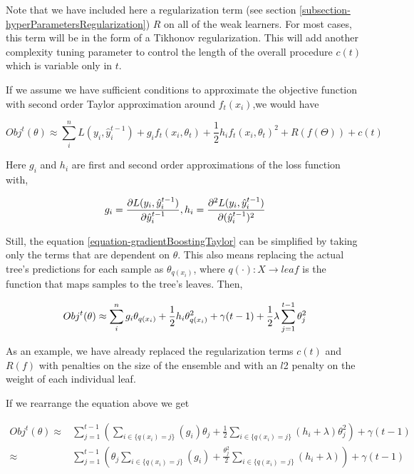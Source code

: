 Note that we have included here a regularization term (see section \cref{subsection-hyperParametersRegularization}) $R$ on all of the weak learners. For most cases, this term will be in the form of a Tikhonov regularization. This will add another complexity tuning parameter to control the length of the overall procedure $c(t)$ which is variable only in $t$.

If we assume we have sufficient conditions to approximate the objective function with second order Taylor approximation around $f_t(x_i)$,we would have

\begin{equation}\label{equation-gradientBoostingTaylor}
Obj^t(\theta) \approx \sum_i^n {L(y_i, \hat{y}^{t-1}_i) + g_i f_t(x_i,\theta_t) + \frac{1}{2} h_i f_t(x_i,\theta_t)^2 } + R(f(\Theta)) + c(t)
\end{equation}

Here $g_i$ and $h_i$ are first and second order approximations of the loss function with,

\begin{equation}
g_i = \frac{\partial L(y_i, \hat{y}^{t-1}_i)}{\partial \hat{y}^{t-1}_i}, \ \\
h_i = \frac{\partial^2 L(y_i, \hat{y}^{t-1}_i)}{\partial (\hat{y}^{t-1}_i)^2 }
\end{equation}

Still, the equation \cref{equation-gradientBoostingTaylor} can be simplified by taking only the terms that are dependent on $\theta$. This also means replacing the actual tree's predictions for each sample as $\theta_{q(x_i)}$, where $q(\cdot): X \rightarrow leaf$ is the function that maps samples to the tree's leaves. Then,


\begin{equation} \label{eq:gb-objSteps1}
Obj^t(\theta) \approx \sum_i^n {g_i \theta_{q(x_i)} + \frac{1}{2} h_i \theta_{q(x_i)}^2 } + \gamma ({t-1}) + \frac{1}{2}\lambda \sum_{j=1}^{t-1} \theta_j^2 \\
\end{equation}

As an example, we have already replaced the regularization terms $c(t)$ and $R(f)$ with penalties on the size of the ensemble and with an $l$2 penalty on the weight of each individual leaf.

If we rearrange the equation above we get

\begin{equation} \label{eq:gb-objSteps1}
\begin{split}
Obj^t(\theta) \approx & \sum_{j=1}^{t-1} \left( \sum_{i \in \{q(x_i)=j\}} (g_i )\theta_{j} + \frac{1}{2} \sum_{i \in \{q(x_i)=j\}} (h_i + \lambda ) \theta_{j}^2 \right) + \gamma ({t-1}) \\
\approx & \sum_{j=1}^{t-1} \left( \theta_{j}\sum_{i \in \{q(x_i)=j\}} (g_i ) + \frac{\theta_{j}^2}{2} \sum_{i \in \{q(x_i)=j\}} (h_i + \lambda ) \right) + \gamma ({t-1})
\end{split}
\end{equation}

